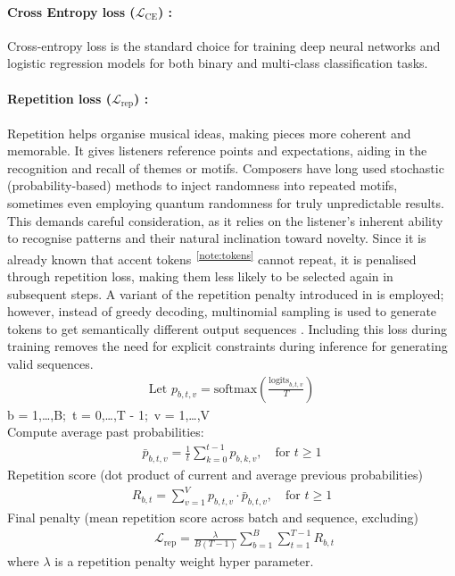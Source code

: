 \documentclass{article}
\begin{document}
\paragraph{Cross Entropy loss ($\mathcal{L}_{\text{CE}}$) : }
Cross-entropy loss is the standard choice for training deep neural 
networks and logistic regression models for both binary and multi-class 
classification tasks. \cite{mlglossary}

\paragraph{Repetition loss ($\mathcal{L}_{\text{rep}}$) : } 
Repetition helps organise musical ideas, making pieces more 
coherent and memorable. It gives listeners reference points and expectations, 
aiding in the recognition and recall of themes or motifs. \cite{Hu_2022}
Composers have long used stochastic (probability-based) methods to inject randomness into repeated motifs, 
sometimes even employing quantum randomness for truly unpredictable results. \cite{yamada_grandi_munoz-gil_barbiero_aloy_lewenstein_2021} 
This demands careful consideration, as it relies on the listener's inherent 
ability to recognise patterns and their natural inclination toward novelty. 
Since it is already known that accent tokens\textsuperscript{~\ref{note:tokens}}
cannot repeat, it is penalised through repetition loss, making them less likely to 
be selected again in subsequent steps. 
A variant of the repetition penalty introduced in \cite{reppenalty} is employed; 
however, instead of greedy decoding, multinomial sampling is used to generate 
tokens to get semantically different output sequences \cite{song2024}. 
Including this loss during training removes the need for explicit constraints during 
inference for generating valid sequences.
\begin{align}
\text{Let } p_{b,t,v} = \text{softmax}\left( \frac{\text{logits}_{b,t,v}}{T} \right)
\end{align}
\quad {} b = 1,\dots,B;\ t = 0,\dots,T - 1;\ v = 1,\dots,V \\[1ex]
Compute average past probabilities:
\begin{align}
\bar{p}_{b,t,v} = \frac{1}{t} \sum_{k=0}^{t-1} p_{b,k,v}, \quad \text{for } t \geq 1
\end{align}
Repetition score (dot product of current and average previous probabilities)
\begin{align}
R_{b,t} = \sum_{v=1}^{V} p_{b,t,v} \cdot \bar{p}_{b,t,v}, \quad \text{for } t \geq 1
\end{align}
Final penalty (mean repetition score across batch and sequence, excluding)
\begin{align}
\qquad \mathcal{L}_{\text{rep}} = \frac{\lambda}{B(T - 1)} \sum_{b=1}^{B} \sum_{t=1}^{T-1} R_{b,t}
\end{align}
where $\lambda$ is a repetition penalty weight hyper parameter.
\end{document}
